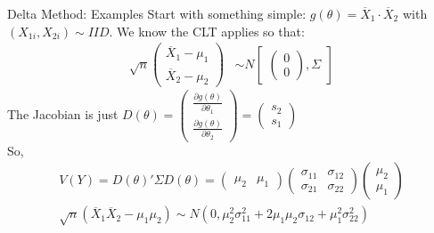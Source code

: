 \documentclass[aspectratio=169]{beamer}
\begin{document}
\begin{frame}{Delta Method: Examples}
Start with something simple: $g(\theta)= \overline{X}_1\cdot \overline{X}_2$ with $(X_{1i},X_{2i}) \sim IID$.
We know the CLT applies so that:
\begin{eqnarray*}
\sqrt{n}
\begin{pmatrix}
\overline{X}_1 - \mu_1\\
\overline{X}_2 - \mu_2
\end{pmatrix} &\sim  N
\begin{bmatrix}
\begin{pmatrix}
0\\
0
\end{pmatrix},
\Sigma
\end{bmatrix}
\end{eqnarray*}
The Jacobian is just $D(\theta) =  \begin{pmatrix}\frac{\partial g(\theta)}{\partial \theta_1} \\ \frac{\partial g(\theta)}{\partial \theta_2}  \end{pmatrix} =  \begin{pmatrix}s_2\\ s_1 \end{pmatrix}$\\
So,
\begin{eqnarray*}
V(Y) = D(\theta)' \Sigma D(\theta) =\begin{pmatrix} \mu_2 & \mu_1 \end{pmatrix}  \begin{pmatrix} \sigma_{11} & \sigma_{12} \\ \sigma_{21} & \sigma_{22} \end{pmatrix} \begin{pmatrix} \mu_2 \\\mu_1  
\end{pmatrix} \\
\sqrt{n} ( \overline{X}_1 \overline{X}_2 - \mu_1 \mu_2) \sim N(0,\mu_2^2 \sigma_{11}^2 + 2 \mu_1 \mu_2 \sigma_{12}  + \mu_1^2 \sigma_{22}^2)
\end{eqnarray*}
\end{frame}
\end{document}
